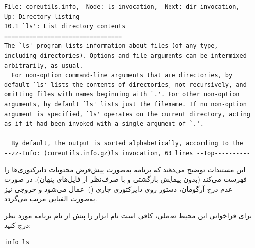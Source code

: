 \begin{latin}
\begin{lstlisting}
File: coreutils.info,  Node: ls invocation,  Next: dir invocation,
Up: Directory listing
10.1 `ls': List directory contents
=================================
The `ls' program lists information about files (of any type,
including directories). Options and file arguments can be intermixed
arbitrarily, as usual.
  For non-option command-line arguments that are directories, by
default `ls' lists the contents of directories, not recursively, and
omitting files with names beginning with `.'. For other non-option
arguments, by default `ls' lists just the filename. If no non-option
argument is specified, `ls' operates on the current directory, acting
as if it had been invoked with a single argument of `.'.

  By default, the output is sorted alphabetically, according to the
--zz-Info: (coreutils.info.gz)ls invocation, 63 lines --Top----------
\end{lstlisting}
\end{latin}

این مستندات توضیح می‌دهند که برنامه  به‌صورت پیش‌فرض محتویات دایرکتوری‌ها را فهرست می‌کند (بدون پیمایش بازگشتی و با صرف‌نظر از فایل‌های پنهان). در صورت عدم درج آرگومان، دستور روی دایرکتوری جاری () اعمال می‌شود و خروجی نیز به‌صورت الفبایی مرتب می‌گردد.

برای فراخوانی این محیط تعاملی، کافی است نام ابزار  را پیش از نام برنامه مورد نظر درج کنید:

\begin{latin}
\begin{lstlisting}
info ls
\end{lstlisting}
\end{latin}

